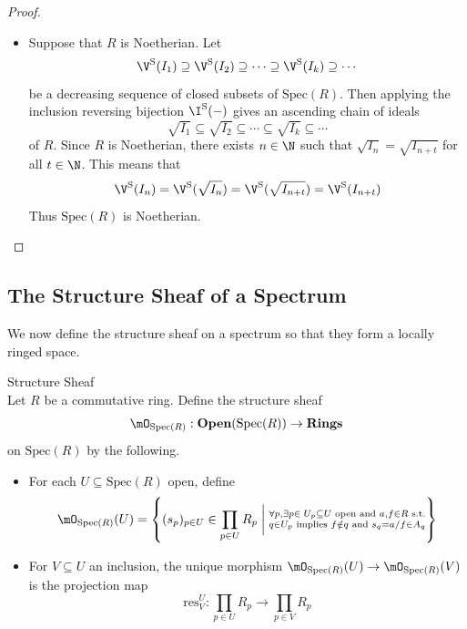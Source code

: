 \documentclass[a4paper]{article}
\begin{document}
\begin{prp}{}{}
\begin{proof}
\begin{itemize}
Suppose for a contradiction that $\emptyset\neq\bigcap_{i=1}^n\V^\text{S}(f_i)$, then there exists a prime ideal $P$ of $R$ such that $f_i\in P$. Hence $\sum_{i=1}^n(f_i)\subseteq P$. But since $\sum_{i=1}^nx_if_i=1$, we have $1\in P$ and this is a contradiction. Hence we must have $\emptyset=\bigcap_{i=1}^n\V^\text{S}(f_i)$. In other words, $\text{Spec}(R)=\bigcup_{i=1}^nD(f_i)$ and so we have found a finite subcover for the given open cover. 

\item Suppose that $R$ is Noetherian. Let $$\V^\text{S}(I_1)\supseteq\V^\text{S}(I_2)\supseteq\cdots\supseteq\V^\text{S}(I_k)\supseteq\cdots$$ be a decreasing sequence of closed subsets of $\text{Spec}(R)$. Then applying the inclusion reversing bijection $\I^\text{S}(-)$ gives an ascending chain of ideals $$\sqrt{I_1}\subseteq\sqrt{I_2}\subseteq\cdots\subseteq\sqrt{I_k}\subseteq\cdots$$ of $R$. Since $R$ is Noetherian, there exists $n\in\N$ such that $\sqrt{I_n}=\sqrt{I_{n+t}}$ for all $t\in\N$. This means that $$\V^\text{S}(I_n)=\V^\text{S}(\sqrt{I_n})=\V^\text{S}(\sqrt{I_{n+t}})=\V^\text{S}(I_{n+t})$$ Thus $\text{Spec}(R)$ is Noetherian. 
\end{itemize}
\end{proof}
\end{prp}

\subsection{The Structure Sheaf of a Spectrum}
We now define the structure sheaf on a spectrum so that they form a locally ringed space. 

\begin{defn}{Structure Sheaf}{}\\
Let $R$ be a commutative ring. Define the structure sheaf $$\mO_{\text{Spec}(R)}:\bold{Open}(\text{Spec}(R))\to\bold{Rings}$$ on $\text{Spec}(R)$ by the following. 
\begin{itemize}
\item For each $U\subseteq\text{Spec}(R)$ open, define $$\mO_{\text{Spec}(R)}(U)=\left\{(s_p)_{p\in U}\in\prod_{p\in U}R_p\;\bigg{|}\;\substack{\forall p,\exists p\in\;U_p\subseteq U\text{ open and }a,f\in R\text{ s.t.}\\q\in U_p\text{ implies }f\notin q\text{ and }s_q=a/f\in A_q}\right\}$$
\item For $V\subseteq U$ an inclusion, the unique morphism $\mO_{\text{Spec}(R)}(U)\to\mO_{\text{Spec}(R)}(V)$ is the projection map $$\text{res}_V^U:\prod_{p\in U}R_p\to\prod_{p\in V}R_p$$
\end{itemize}
\end{defn}
\end{document}
